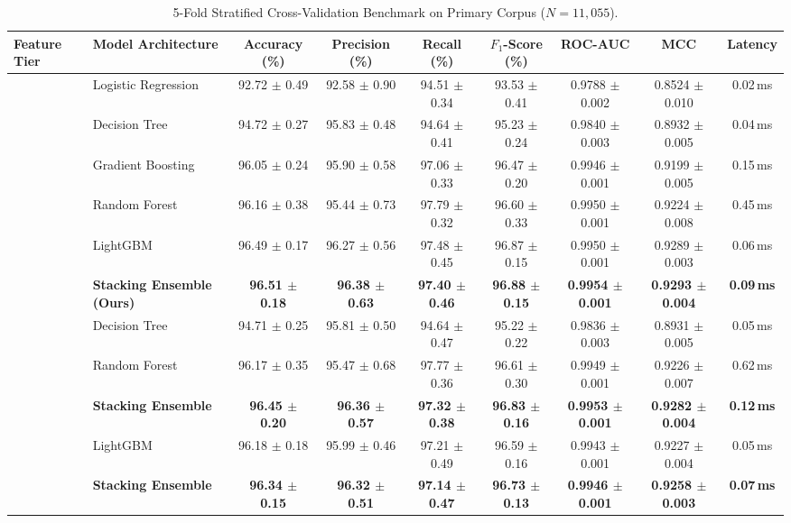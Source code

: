 \documentclass[conference]{IEEEtran}
\begin{document}
\begin{table}[t]
\centering
\caption{5-Fold Stratified Cross-Validation Benchmark on Primary Corpus ($N = 11,055$).}
\label{tab:cv_results}
\begin{tabular}{llccccccc}
\toprule
\textbf{Feature Tier} & \textbf{Model Architecture} & \textbf{Accuracy (\%)} & \textbf{Precision (\%)} & \textbf{Recall (\%)} & \textbf{$F_1$-Score (\%)} & \textbf{ROC-AUC} & \textbf{MCC} & \textbf{Latency} \\
\midrule
{} 
 & Logistic Regression & 92.72 $\pm$ 0.49 & 92.58 $\pm$ 0.90 & 94.51 $\pm$ 0.34 & 93.53 $\pm$ 0.41 & 0.9788 $\pm$ 0.002 & 0.8524 $\pm$ 0.010 & 0.02\,ms \\
 & Decision Tree & 94.72 $\pm$ 0.27 & 95.83 $\pm$ 0.48 & 94.64 $\pm$ 0.41 & 95.23 $\pm$ 0.24 & 0.9840 $\pm$ 0.003 & 0.8932 $\pm$ 0.005 & 0.04\,ms \\
 & Gradient Boosting & 96.05 $\pm$ 0.24 & 95.90 $\pm$ 0.58 & 97.06 $\pm$ 0.33 & 96.47 $\pm$ 0.20 & 0.9946 $\pm$ 0.001 & 0.9199 $\pm$ 0.005 & 0.15\,ms \\
 & Random Forest & 96.16 $\pm$ 0.38 & 95.44 $\pm$ 0.73 & 97.79 $\pm$ 0.32 & 96.60 $\pm$ 0.33 & 0.9950 $\pm$ 0.001 & 0.9224 $\pm$ 0.008 & 0.45\,ms \\
 & LightGBM & 96.49 $\pm$ 0.17 & 96.27 $\pm$ 0.56 & 97.48 $\pm$ 0.45 & 96.87 $\pm$ 0.15 & 0.9950 $\pm$ 0.001 & 0.9289 $\pm$ 0.003 & 0.06\,ms \\
 & \textbf{Stacking Ensemble (Ours)} & \textbf{96.51 $\pm$ 0.18} & \textbf{96.38 $\pm$ 0.63} & \textbf{97.40 $\pm$ 0.46} & \textbf{96.88 $\pm$ 0.15} & \textbf{0.9954 $\pm$ 0.001} & \textbf{0.9293 $\pm$ 0.004} & \textbf{0.09\,ms} \\
\midrule
{} 
 & Decision Tree & 94.71 $\pm$ 0.25 & 95.81 $\pm$ 0.50 & 94.64 $\pm$ 0.47 & 95.22 $\pm$ 0.22 & 0.9836 $\pm$ 0.003 & 0.8931 $\pm$ 0.005 & 0.05\,ms \\
 & Random Forest & 96.17 $\pm$ 0.35 & 95.47 $\pm$ 0.68 & 97.77 $\pm$ 0.36 & 96.61 $\pm$ 0.30 & 0.9949 $\pm$ 0.001 & 0.9226 $\pm$ 0.007 & 0.62\,ms \\
 & \textbf{Stacking Ensemble} & \textbf{96.45 $\pm$ 0.20} & \textbf{96.36 $\pm$ 0.57} & \textbf{97.32 $\pm$ 0.38} & \textbf{96.83 $\pm$ 0.16} & \textbf{0.9953 $\pm$ 0.001} & \textbf{0.9282 $\pm$ 0.004} & \textbf{0.12\,ms} \\
\midrule
{} 
 & LightGBM & 96.18 $\pm$ 0.18 & 95.99 $\pm$ 0.46 & 97.21 $\pm$ 0.49 & 96.59 $\pm$ 0.16 & 0.9943 $\pm$ 0.001 & 0.9227 $\pm$ 0.004 & 0.05\,ms \\
 & \textbf{Stacking Ensemble} & \textbf{96.34 $\pm$ 0.15} & \textbf{96.32 $\pm$ 0.51} & \textbf{97.14 $\pm$ 0.47} & \textbf{96.73 $\pm$ 0.13} & \textbf{0.9946 $\pm$ 0.001} & \textbf{0.9258 $\pm$ 0.003} & \textbf{0.07\,ms} \\
\bottomrule
\end{tabular}
\end{table}
\end{document}
